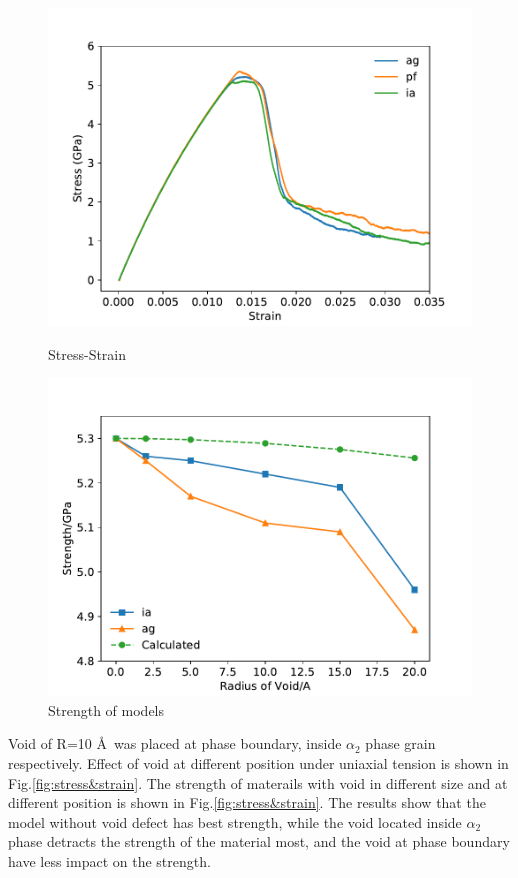 \documentclass[materials,article,submit,moreauthors,pdftex,10pt,a4paper]{Definitions/mdpi}
\begin{document}
\begin{figure}[ht]
	\centering
	\begin{minipage}{0.495\textwidth}
		\includegraphics[width=1\linewidth]{img/allline}
		\centering
		\caption{Stress-Strain}
		\label{fig:stress&strain}
	\end{minipage}	
	\hfill
	\begin{minipage}{0.495\textwidth}		
		\includegraphics[width=1\linewidth]{img/effect_of_vol}
		\centering
		\caption{Strength of models}
		\label{fig:strength}
	\end{minipage}
\end{figure}

Void of R=10 \AA\ was placed at phase boundary, inside $\alpha_2$ phase grain respectively. Effect of void at different position under uniaxial tension is shown in Fig.\ref{fig:stress&strain}. The strength of materails with void in different size and at different position is shown in Fig.\ref{fig:stress&strain}. The results show that the model without void defect has best strength, while the void located inside $\alpha_2$ phase detracts the strength of the material most, and the void at phase boundary have less impact on the strength.
	
\end{document}

